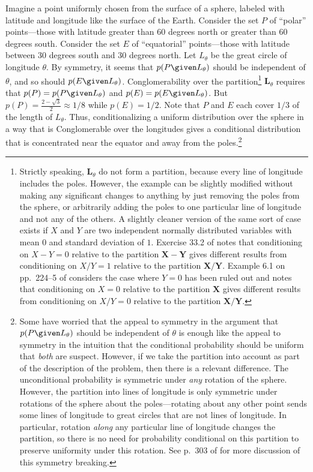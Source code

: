 \label{borel} Imagine a point uniformly chosen from the surface of a sphere, labeled with latitude and longitude like the surface of the Earth. Consider the set $P$ of ``polar'' points---those with latitude greater than 60 degrees north or greater than 60 degrees south. Consider the set $E$ of ``equatorial'' points---those with latitude between 30 degrees south and 30 degrees north. Let $L_\theta$ be the great circle of longitude $\theta$. By symmetry, it seems that $p(P \given L_\theta)$ should be independent of $\theta$, and so should $p(E \given L_\theta)$. Conglomerability over the partition\footnote{Strictly speaking, $\mathbf{L}_\theta$ do not form a partition, because every line of longitude includes the poles. However, the example can be slightly modified without making any significant changes to anything by just removing the poles from the sphere, or arbitrarily adding the poles to one particular line of longitude and not any of the others. A slightly cleaner version of the same sort of case exists if $X$ and $Y$ are two independent normally distributed variables with mean $0$ and standard deviation of $1$. Exercise 33.2 of \citet{billingsley} notes that conditioning on $X-Y=0$ relative to the partition $\mathbf{X-Y}$ gives different results from conditioning on $X/Y=1$ relative to the partition $\mathbf{X/Y}$. Example 6.1 on pp.\ 224--5 of \citet{statimp} considers the case where $Y=0$ has been ruled out and notes that conditioning on $X=0$ relative to the partition $\mathbf{X}$ gives different results from conditioning on $X/Y=0$ relative to the partition $\mathbf{X/Y}$.} $\mathbf{L}_\theta$ requires that $p(P)=p(P \given L_\theta)$ and $p(E)=p(E \given L_\theta)$. But $p(P)=\frac{2-\sqrt 3}{2}\approx 1/8$ while $p(E)=1/2$. Note that $P$ and $E$ each cover $1/3$ of the length of $L_\theta$. Thus, conditionalizing a uniform distribution over the sphere in a way that is Conglomerable over the longitudes gives a conditional distribution that is concentrated near the equator and away from the poles.\footnote{Some have worried that the appeal to symmetry in the argument that $p(P \given L_\theta)$ should be independent of $\theta$ is enough like the appeal to symmetry in the intuition that the conditional probability should be uniform that \emph{both} are suspect. However, if we take the partition into account as part of the description of the problem, then there is a relevant difference. The unconditional probability is symmetric under \emph{any} rotation of the sphere. However, the partition into lines of longitude is only symmetric under rotations of the sphere about the poles---rotating about any other point sends some lines of longitude to great circles that are not lines of longitude. In particular, rotation \emph{along} any particular line of longitude changes the partition, so there is no need for probability conditional on this partition to preserve uniformity under this rotation. See p.\ 303 of \citet{changpollard} for more discussion of this symmetry breaking.}

